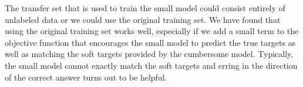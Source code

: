 The transfer set that is used to train the small model could consist entirely of unlabeled data \cite{Caruana} or we could use
the original training set.  We have found that using the original training set works well, especially if we add a small
term to the objective function that encourages the small model to predict the true targets as well as matching the soft
targets provided by the cumbersome model.  Typically, the small model cannot exactly match the soft targets and erring
in the direction of the correct answer turns out to be helpful.
